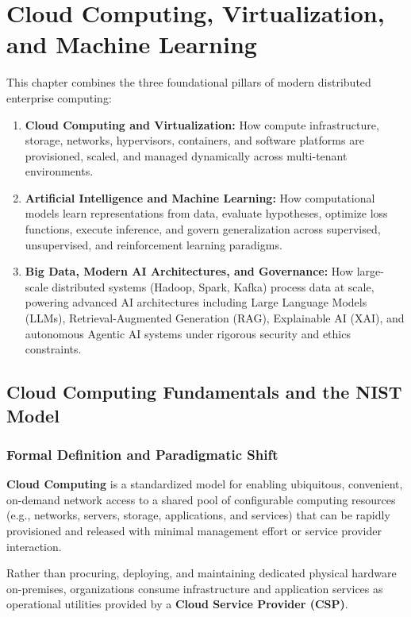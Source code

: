 
\chapter{Cloud Computing, Virtualization, and Machine Learning}
\label{ch:cloud_virtualization_ml}

This chapter combines the three foundational pillars of modern distributed enterprise computing:
\begin{enumerate}[label=\bfseries\arabic*.]
    \item \textbf{Cloud Computing and Virtualization:} How compute infrastructure, storage, networks, hypervisors, containers, and software platforms are provisioned, scaled, and managed dynamically across multi-tenant environments.
    \item \textbf{Artificial Intelligence and Machine Learning:} How computational models learn representations from data, evaluate hypotheses, optimize loss functions, execute inference, and govern generalization across supervised, unsupervised, and reinforcement learning paradigms.
    \item \textbf{Big Data, Modern AI Architectures, and Governance:} How large-scale distributed systems (Hadoop, Spark, Kafka) process data at scale, powering advanced AI architectures including Large Language Models (LLMs), Retrieval-Augmented Generation (RAG), Explainable AI (XAI), and autonomous Agentic AI systems under rigorous security and ethics constraints.
\end{enumerate}


\section{Cloud Computing Fundamentals and the NIST Model}
\label{sec:cloud_fundamentals}

\subsection{Formal Definition and Paradigmatic Shift}
\textbf{Cloud Computing} is a standardized model for enabling ubiquitous, convenient, on-demand network access to a shared pool of configurable computing resources (e.g., networks, servers, storage, applications, and services) that can be rapidly provisioned and released with minimal management effort or service provider interaction.

Rather than procuring, deploying, and maintaining dedicated physical hardware on-premises, organizations consume infrastructure and application services as operational utilities provided by a \textbf{Cloud Service Provider (CSP)}.

